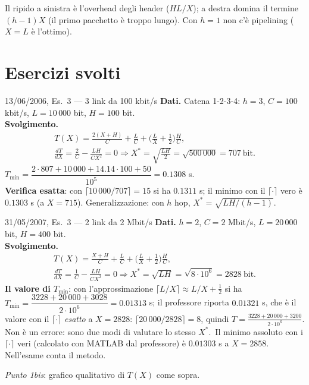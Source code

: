 \begin{attenzione}
Il ripido a sinistra è l'overhead degli header ($H L/X$); a destra domina il termine $(h-1)X$ (il primo pacchetto è troppo lungo). Con $h=1$ non c'è pipelining ($X=L$ è l'ottimo).
\end{attenzione}

\section{Esercizi svolti}

\begin{esempio}{13/06/2006, Es.~3 --- 3 link da 100 kbit/s}
\textbf{Dati.} Catena 1-2-3-4: $h=3$, $C=100$ kbit/s, $L=10\,000$ bit, $H=100$ bit.\\
\textbf{Svolgimento.}
\[\begin{gathered}
T(X)=\frac{2(X+H)}{C}+\frac LC+\Big(\frac LX+\frac12\Big)\frac HC,\\
\frac{dT}{dX}=\frac2C-\frac{LH}{CX^2}=0\Rightarrow X^*=\sqrt{\tfrac{LH}{2}}=\sqrt{500\,000}=707\ \text{bit}.
\end{gathered}\]
$T_{\min}=\dfrac{2\cdot807+10\,000+14.14\cdot100+50}{10^5}=0.1308$ s.\\
\textbf{Verifica esatta\mio}: con $\lceil10\,000/707\rceil=15$ si ha $0.1311$ s; il minimo con il $\lceil\cdot\rceil$ vero è $0.1303$ s (a $X=715$). Generalizzazione: con $h$ hop, $X^*=\sqrt{LH/(h-1)}$.
\end{esempio}

\begin{esempio}{31/05/2007, Es.~3 --- 2 link da 2 Mbit/s}
\textbf{Dati.} $h=2$, $C=2$ Mbit/s, $L=20\,000$ bit, $H=400$ bit.\\
\textbf{Svolgimento.}
\[\begin{gathered}
T(X)=\frac{X+H}{C}+\frac LC+\Big(\frac LX+\frac12\Big)\frac HC,\\
\frac{dT}{dX}=\frac1C-\frac{LH}{CX^2}=0\Rightarrow X^*=\sqrt{LH}=\sqrt{8\cdot10^6}=2828\ \text{bit}.
\end{gathered}\]
\textbf{Il valore di $T_{\min}$}: con l'approssimazione $\lceil L/X\rceil\approx L/X+\tfrac12$ si ha $T_{\min}=\dfrac{3228+20\,000+3028}{2\cdot10^6}=0.01313$ s; il professore riporta $0.01321$ s, che è il valore con il $\lceil\cdot\rceil$ \emph{esatto} a $X=2828$: $\lceil20\,000/2828\rceil=8$, quindi $T=\tfrac{3228+20\,000+3200}{2\cdot10^6}$. Non è un errore: sono due modi di valutare lo stesso $X^*$.\mio\ Il minimo assoluto con i $\lceil\cdot\rceil$ veri (calcolato con MATLAB dal professore) è $0.01303$ s a $X=2858$. Nell'esame conta il metodo.

\emph{Punto 1bis}: grafico qualitativo di $T(X)$ come sopra.
\end{esempio}

